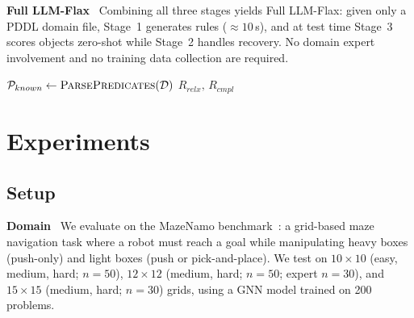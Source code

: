 \documentclass[letterpaper, 10pt, journal, twoside]{IEEEtran}
\newcommand{\myparagraph}[1]{\noindent\textbf{#1}~}
\newcommand{\method}{LLM-Flax\xspace}
\newcommand{\fullmethod}{Full LLM-Flax\xspace}
\begin{document}
\myparagraph{Full LLM-Flax}
Combining all three stages yields \fullmethod: given only a PDDL domain file, Stage~1 generates rules (${\approx}10$\,s), and at test time Stage~3 scores objects zero-shot while Stage~2 handles recovery.
No domain expert involvement and no training data collection are required.

\begin{algorithm}[t]
\caption{\method Rule Generation (Stage 1)}
\label{alg:gen}
\BlankLine
$\mathcal{P}_{known} \leftarrow \textsc{ParsePredicates}(\mathcal{D})$\;
\Return $R_{relx},\, R_{cmpl}$\;
\end{algorithm}


\section{Experiments}
\label{sec:experiments}

\subsection{Setup}

\myparagraph{Domain}
We evaluate on the MazeNamo benchmark~\cite{silver2021planning}: a grid-based maze navigation task where a robot must reach a goal while manipulating heavy boxes (push-only) and light boxes (push or pick-and-place).
We test on $10{\times}10$ (easy, medium, hard; $n{=}50$), $12{\times}12$ (medium, hard; $n{=}50$; expert $n{=}30$), and $15{\times}15$ (medium, hard; $n{=}30$) grids, using a GNN model trained on 200 problems.
\end{document}
